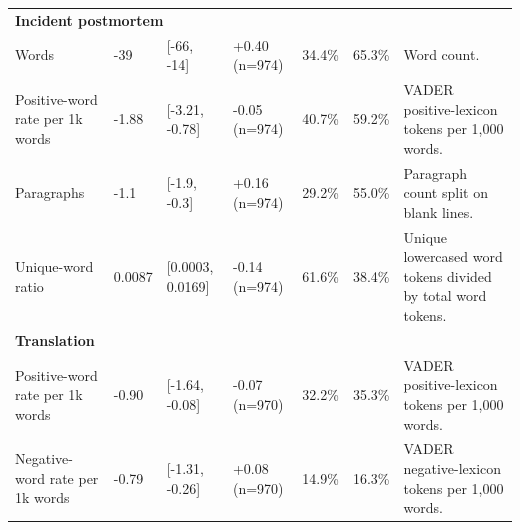 \begin{longtable}{lllllll}
\multicolumn{7}{l}{\textbf{Incident postmortem}} \\
Words & -39 & [-66, -14] & +0.40 (n=974) & 34.4\% & 65.3\% & Word count. \\
Positive-word rate per 1k words & -1.88 & [-3.21, -0.78] & -0.05 (n=974) & 40.7\% & 59.2\% & VADER positive-lexicon tokens per 1,000 words. \\
Paragraphs & -1.1 & [-1.9, -0.3] & +0.16 (n=974) & 29.2\% & 55.0\% & Paragraph count split on blank lines. \\
Unique-word ratio & 0.0087 & [0.0003, 0.0169] & -0.14 (n=974) & 61.6\% & 38.4\% & Unique lowercased word tokens divided by total word tokens. \\
\multicolumn{7}{l}{\textbf{Translation}} \\
Positive-word rate per 1k words & -0.90 & [-1.64, -0.08] & -0.07 (n=970) & 32.2\% & 35.3\% & VADER positive-lexicon tokens per 1,000 words. \\
Negative-word rate per 1k words & -0.79 & [-1.31, -0.26] & +0.08 (n=970) & 14.9\% & 16.3\% & VADER negative-lexicon tokens per 1,000 words. \\
\end{longtable}

